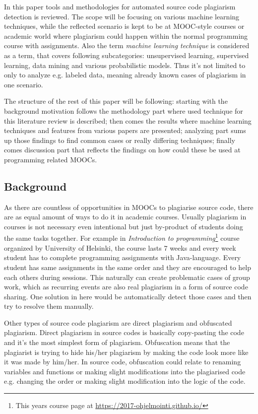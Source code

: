 \documentclass[english]{tktltiki2}
\theoremstyle{definition}
\theoremstyle{remark}
\begin{document}
In this paper tools and methodologies for automated source code plagiarism detection is reviewed. The scope will be focusing on various machine learning techniques, while the reflected scenario is kept to be at MOOC-style courses or academic world where plagiarism could happen within the normal programming course with assignments. Also the term \textit{machine learning technique} is considered as a term, that covers following subcategories: unsupervised learning, supervised learning, data mining and various probabilistic models. Thus it's not limited to only to analyze e.g. labeled data, meaning already known cases of plagiarism in one scenario. 

The structure of the rest of this paper will be following: starting with the background motivation follows the methodology part where used technique for this literature review is described; then comes the results where machine learning techniques and features from various papers are presented; analyzing part sums up those findings to find common cases or really differing techniques; finally comes discussion part that reflects the findings on how could these be used at programming related MOOCs.

\subsection{Background}


As there are countless of opportunities in MOOCs to plagiarise source code, there are as equal amount of ways to do it in academic courses. Usually plagiarism in courses is not necessary even intentional but just by-product of students doing the same tasks together. For example in \textit{Introduction to programming}\footnote{This years course page at \url{https://2017-ohjelmointi.github.io/}} course organized by University of Helsinki, the course lasts 7 weeks and every week student has to complete programming assignments with Java-language. Every student has same assignments in the same order and they are encouraged to help each others during sessions. This naturally can create problematic cases of group work, which as recurring events are also real plagiarism in a form of source code sharing. One solution in here would be automatically detect those cases and then try to resolve them manually.  

Other types of source code plagiarism are direct plagiarism and obfuscated plagiarism. Direct plagiarism in source codes is basically copy-pasting the code and it's the most simplest form of plagiarism. Obfuscation means that the plagiarist is trying to hide his/her plagiarism by making the code look more like it was made by him/her. In source code, obfuscation could relate to renaming variables and functions or making slight modifications into the plagiarised code e.g. changing the order or making slight modification into the logic of the code.
\end{document}
